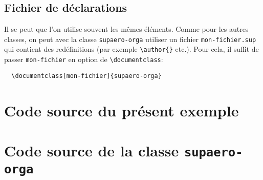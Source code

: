 \documentclass[fr]{supaero-orga}
\begin{document}
\subsection{Fichier de déclarations}
\label{sec:fich-de-decl}

Il se peut que l'on utilise souvent les mêmes éléments. Comme pour les
autres classes, on peut avec la classe \texttt{supaero-orga} utiliser
un fichier \texttt{mon-fichier.sup} qui contient des redéfinitions
(par exemple \verb!\author{}! etc.). Pour cela, il suffit de passer
\verb!mon-fichier! en option de \verb!\documentclass!:

\begin{verbatim}
  \documentclass[mon-fichier]{supaero-orga}
\end{verbatim}

\section{Code source du présent exemple}



\section{Code source de la classe \texttt{supaero-orga}}
\label{sec:code-source}


\end{document}
